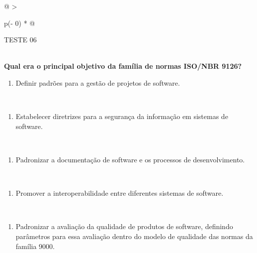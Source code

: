 \documentclass[
]{book}
\providecommand{\tightlist}{%
  \setlength{\itemsep}{0pt}\setlength{\parskip}{0pt}}
\begin{document}
\begin{longtable}[]{@{}
  >{\raggedright\arraybackslash}p{(\columnwidth - 0\tabcolsep) * }@{}}
\toprule\noalign{}
\begin{minipage}[b]{\linewidth}\raggedright
TESTE 06
\end{minipage} \\
\midrule\noalign{}
\endhead
\bottomrule\noalign{}
\endlastfoot
\textbf{Qual era o principal objetivo da família de normas ISO/NBR 9126?} \\
\begin{minipage}[t]{\linewidth}\raggedright
\begin{enumerate}
\def\labelenumi{\alph{enumi})}
\tightlist
\item
  Definir padrões para a gestão de projetos de software.
\end{enumerate}
\end{minipage} \\
\begin{minipage}[t]{\linewidth}\raggedright
\begin{enumerate}
\def\labelenumi{\alph{enumi})}
\setcounter{enumi}{1}
\tightlist
\item
  Estabelecer diretrizes para a segurança da informação em sistemas de software.
\end{enumerate}
\end{minipage} \\
\begin{minipage}[t]{\linewidth}\raggedright
\begin{enumerate}
\def\labelenumi{\alph{enumi})}
\setcounter{enumi}{2}
\tightlist
\item
  Padronizar a documentação de software e os processos de desenvolvimento.
\end{enumerate}
\end{minipage} \\
\begin{minipage}[t]{\linewidth}\raggedright
\begin{enumerate}
\def\labelenumi{\alph{enumi})}
\setcounter{enumi}{3}
\tightlist
\item
  Promover a interoperabilidade entre diferentes sistemas de software.
\end{enumerate}
\end{minipage} \\
\begin{minipage}[t]{\linewidth}\raggedright
\begin{enumerate}
\def\labelenumi{\alph{enumi})}
\setcounter{enumi}{4}
\tightlist
\item
  Padronizar a avaliação da qualidade de produtos de software, definindo parâmetros para essa avaliação dentro do modelo de qualidade das normas da família 9000.
\end{enumerate}
\end{minipage} \\
\end{longtable}
\end{document}
